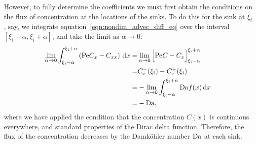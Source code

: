 However, to fully determine the coefficients we must first obtain the
conditions on the flux of concentration at the locations of the sinks. To do
this for the sink at \(\xi_i\), say, we integrate
equation~\eqref{eqn:nondim_advec_diff_eq} over the interval
\([\xi_i-\alpha,\xi_i+\alpha]\), and take the limit as \(\alpha \to 0\):
\begin{align*}
    \lim_{\alpha \to 0}
    \int_{\xi_i-\alpha}^{\xi_i+\alpha}\left(\mathrm{Pe} C_x - C_{xx}\right)\,\mathrm{d} x = &
    \lim_{\alpha \to 0}
    \Big[\mathrm{Pe} C - C_x\Big]_{\xi_i-\alpha}^{\xi_i+\alpha}\\
    = & C_x^-(\xi_i) - C_x^+(\xi_i)\\
    = & -\lim_{\alpha \to 0}
    \int_{\xi_i-\alpha}^{\xi_i+\alpha}\mathrm{Da} f(x) \,\mathrm{d} x\\
    = & - \mathrm{Da},
\end{align*}
where we have applied the condition that the concentration \(C(x)\) is
continuous everywhere, and standard properties of the Dirac delta function.
Therefore, the flux of the concentration decreases by the Damköhler
number \(\mathrm{Da}\) at each sink.

